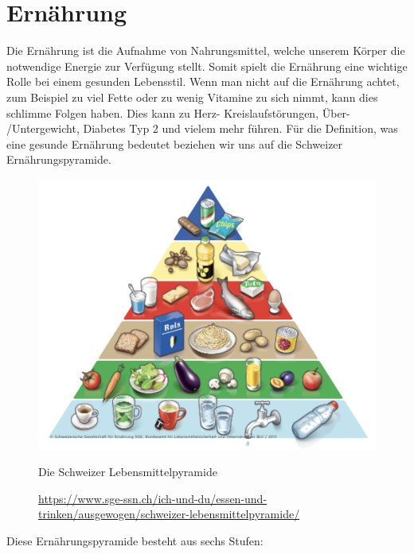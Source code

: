 \section{Ernährung}
\authortoc{\dario}{\sectionident}
Die Ernährung ist die Aufnahme von Nahrungsmittel, welche unserem Körper die notwendige Energie zur Verfügung stellt. Somit spielt die Ernährung eine wichtige Rolle bei einem gesunden Lebensstil. Wenn man nicht auf die Ernährung achtet, zum Beispiel zu viel Fette oder zu wenig Vitamine zu sich nimmt, kann dies schlimme Folgen haben. Dies kann zu Herz- Kreislaufstörungen, Über- /Untergewicht, Diabetes Typ 2 und vielem mehr führen.
\newline
Für die Definition, was eine gesunde Ernährung bedeutet beziehen wir uns auf die Schweizer Ernährungspyramide.
\newline
\begin{figure}[!ht]
  \centering
  \includegraphics[width=0.5\linewidth]{./images/lebensmittelpyramide.png}
  \caption{Die Schweizer Lebensmittelpyramide}
  \label{fig:pyramide}
  \caption*{\url{https://www.sge-ssn.ch/ich-und-du/essen-und-trinken/ausgewogen/schweizer-lebensmittelpyramide/}}
\end{figure}
\pagebreak
Diese Ernährungspyramide besteht aus sechs Stufen:
